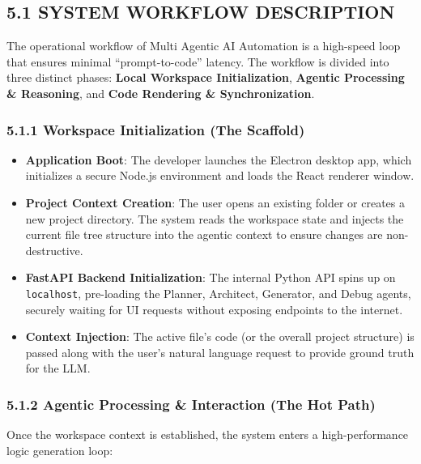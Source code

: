 \documentclass[
  12pt,
]{article}
\providecommand{\tightlist}{%
  \setlength{\itemsep}{0pt}\setlength{\parskip}{0pt}}
\begin{document}
\subsection{5.1 SYSTEM WORKFLOW
DESCRIPTION}\label{system-workflow-description}

The operational workflow of Multi Agentic AI Automation is a high-speed
loop that ensures minimal ``prompt-to-code'' latency. The workflow is
divided into three distinct phases: \textbf{Local Workspace
Initialization}, \textbf{Agentic Processing \& Reasoning}, and
\textbf{Code Rendering \& Synchronization}.

\subsubsection{5.1.1 Workspace Initialization (The
Scaffold)}\label{workspace-initialization-the-scaffold}

\begin{itemize}
\tightlist
\item
  \textbf{Application Boot}: The developer launches the Electron desktop
  app, which initializes a secure Node.js environment and loads the
  React renderer window.
\item
  \textbf{Project Context Creation}: The user opens an existing folder
  or creates a new project directory. The system reads the workspace
  state and injects the current file tree structure into the agentic
  context to ensure changes are non-destructive.
\item
  \textbf{FastAPI Backend Initialization}: The internal Python API spins
  up on \texttt{localhost}, pre-loading the Planner, Architect,
  Generator, and Debug agents, securely waiting for UI requests without
  exposing endpoints to the internet.
\item
  \textbf{Context Injection}: The active file's code (or the overall
  project structure) is passed along with the user's natural language
  request to provide ground truth for the LLM.
\end{itemize}

\subsubsection{5.1.2 Agentic Processing \& Interaction (The Hot
Path)}\label{agentic-processing-interaction-the-hot-path}

Once the workspace context is established, the system enters a
high-performance logic generation loop:
\end{document}
